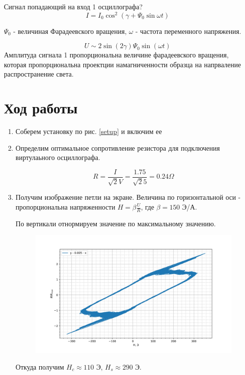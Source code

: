 \documentclass[a4paper]{article}
\begin{document}
Сигнал попадающий на вход 1 осциллографа?
$$I = I_0 \cos^2{(\gamma + \Psi_0 \sin{\omega t})}$$ 

$\Psi_0$ - величиная Фарадеевского вращения, $\omega$ - частота переменного напряжения.

$$U \sim 2 \sin{(2 \gamma)} \Psi_0 \sin{(\omega t)}$$
Амплитуда сигнала 1 пропорциональна величине фарадеевского вращения, которая пропорциональна проектции намагниченности образца на напрваление распространение света. 

\section{Ход работы}

\begin{enumerate}
    \item Соберем установку по рис. \ref{setup} и включим ее
    \item Определим оптимальное сопротивление резистора для подключения виртулаьного осциллографа. \par 
        $$R = \frac{I}{\sqrt{2} V} = \frac{1.75}{\sqrt{2} 5} = 0.24 \Omega$$
    \item Получим изображение петли на экране. Величина по горизонтальной оси - пропорциональна напряженности $H = \beta \frac{U}{R}$, где $\beta = 150$ Э/А. \par 
        По вертикали отнормируем значение по максимальному значению.
        \begin{figure}[H]
            \begin{center}
                \includegraphics[scale=0.7]{gr1.jpg}
                \caption{}
                \label{gr1}
            \end{center}
        \end{figure}

    Откуда получим $H_c \approx 110$ Э, $H_s \approx 290$ Э.

\end{enumerate}
\end{document}
